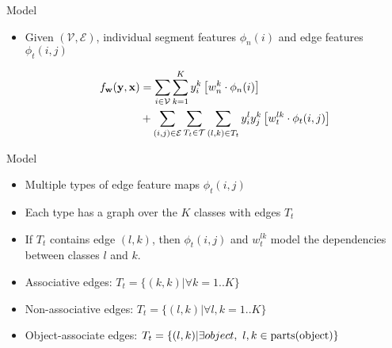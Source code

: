 \documentclass{beamer}
\newcommand{\x}{{\mathbf x}}     %
\newcommand{\y}{{\mathbf y}}     %
\newcommand{\ysc}[2]{{y_{#1}^{#2}}}    %
\newcommand{\fn}[1]{{\phi_n(#1)}}      %
\newcommand{\fe}[3]{{\phi_{#1}(#2,#3)}}%
\newcommand{\w}{{\mathbf w}}           %
\newcommand{\wn}[1]{{w_n^{#1}}}        %
\newcommand{\we}[3]{{w_{#1}^{#2#3}}}   %
\newcommand{\df}[3]{{f_{#3}(#1,#2)}}   %
\begin{document}
\begin{frame}{Model}
\begin{itemize}

\item Given $(\mathcal{V},\mathcal{E})$, individual segment features $\fn{i}$ and edge features $\fe{t}{i}{j}$

\begin{equation} \label{eq:model}
\begin{split}
\df{\y}{\x}{\w} & = \sum_{i \in \mathcal{V}} \sum_{k=1}^{K} \ysc{i}{k} \left[\wn{k} \cdot \fn{i} \right] \\
 & + \sum_{(i,j)\in \mathcal{E}}   \sum_{T_t \in {\cal T}}  \sum_{(l,k)\in T_t} \ysc{i}{l} \ysc{j}{k}  \left[\we{t}{l}{k} \cdot \fe{t}{i}{j}\right] 
 \end{split}
\end{equation}

\end{itemize}
\end{frame}

\begin{frame}{Model}

\begin{itemize}

\item Multiple types of edge feature maps $\fe{t}{i}{j}$
\item Each type has a graph over the $K$ classes with edges  $T_t$
\item If $T_t$ contains edge $(l,k)$, then $\fe{t}{i}{j}$ and $\we{t}{l}{k}$  model the dependencies between classes $l$ and $k$.
\item Associative edges:  ${T_t}=\{(k,k)| \forall k=1..K\}$
\item Non-associative edges: $T_t=\{(l,k)| \forall l,k=1..K\}$
\item Object-associate edges: $T_t=\{(l,k) | \exists object , ~ l,k\in {\rm parts}({\rm object})\}$

\end{itemize}
\end{frame}
\end{document}
